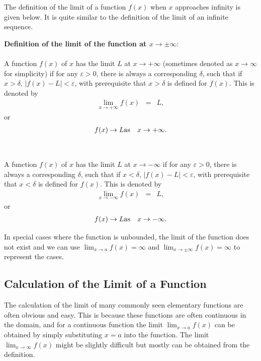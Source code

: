 The definition of the limit of a function $f(x)$ when $x$ approaches infinity is given below. It is quite similar to the definition of the limit of an infinite sequence.
\begin{mdframed}
\textbf{Definition of the limit of the function at $x\rightarrow \pm \infty$}:
\\
\\
\noindent A function $f(x)$ of $x$ has the limit $L$ at $x \rightarrow +\infty$ (sometimes denoted as $x \rightarrow \infty$ for simplicity) if for any $\varepsilon > 0$, there is always a corresponding $\delta$, such that if $x > \delta$, $|f(x)-L| < \varepsilon$, with prerequisite that $x > \delta$ is defined for $f(x)$. This is denoted by
\begin{eqnarray}
   \lim_{x\rightarrow +\infty} f(x) &=& L, \nonumber
\end{eqnarray}
or
\begin{eqnarray}
  f(x) \rightarrow L & \textup{as} & x \rightarrow +\infty. \nonumber
\end{eqnarray}
\\
\\
\noindent A function $f(x)$ of $x$ has the limit $L$ at $x \rightarrow -\infty$ if for any $\varepsilon > 0$, there is always a corresponding $\delta$, such that if $x < \delta$, $|f(x)-L| < \varepsilon$, with prerequisite that $x < \delta$ is defined for $f(x)$. This is denoted by
\begin{eqnarray}
   \lim_{x\rightarrow -\infty} f(x) &=& L, \nonumber
\end{eqnarray}
or
\begin{eqnarray}
  f(x) \rightarrow L & \textup{as} & x \rightarrow -\infty. \nonumber
\end{eqnarray}
\end{mdframed}

In special cases where the function is unbounded, the limit of the function does not exist and we can use $\lim_{x\rightarrow a}f(x) =  \infty$ and $\lim_{x\rightarrow \pm \infty}f(x) = \infty$ to represent the cases.

\subsection{Calculation of the Limit of a Function} \label{ch1subsec:calculationlimitfunction}

The calculation of the limit of many commonly seen elementary functions are often obvious and easy. This is because these functions are often continuous in the domain, and for a continuous function the limit $\lim_{x\rightarrow a}f(x)$ can be obtained by simply substituting $x=a$ into the function. The limit $\lim_{x\rightarrow \infty}f(x)$ might be slightly difficult but mostly can be obtained from the definition.

